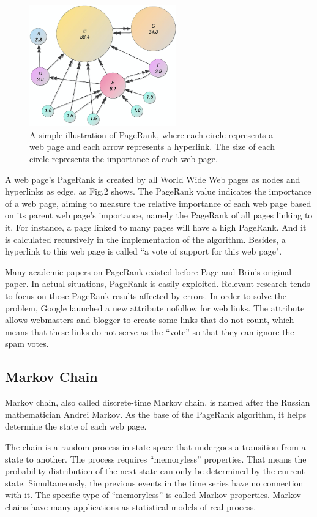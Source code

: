 \documentclass[lettersize,journal,12pt]{IEEEtran}
\begin{document}
\begin{figure}[h]
    \centering
    \includegraphics[width=2.5in]{images/fig3.jpeg}
    \caption{A simple illustration of PageRank, where each circle represents a web page and each arrow represents a hyperlink. The size of each circle represents the importance of each web page.}
    \label{fig3}
\end{figure}

A web page's PageRank is created by all World Wide Web pages as nodes and hyperlinks as edge, as Fig.2 shows. The PageRank value indicates the importance of a web page, aiming to measure the relative importance of each web page based on its parent web page's importance, namely the PageRank of all pages linking to it. For instance, a page linked to many pages will have a high PageRank. And it is calculated recursively in the implementation of the algorithm. Besides, a hyperlink to this web page is called ``a vote of support for this web page". 

Many academic papers on PageRank existed before Page and Brin's original paper. In actual situations, PageRank is easily exploited. Relevant research tends to focus on those PageRank results affected by errors. In order to solve the problem, Google launched a new attribute nofollow for web links. The attribute allows webmasters and blogger to create some links that do not count, which means that these links do not serve as the ``vote'' so that they can ignore the spam votes.

\subsection{Markov Chain}

Markov chain, also called discrete-time Markov chain, is named after the Russian mathematician Andrei Markov. As the base of the PageRank algorithm, it helps determine the state of each web page.

The chain is a random process in state space that undergoes a transition from a state to another. The process requires ``memoryless'' properties. That means the probability distribution of the next state can only be determined by the current state. Simultaneously, the previous events in the time series have no connection with it. The specific type of ``memoryless'' is called Markov properties. Markov chains have many applications as statistical models of real process.
\end{document}
